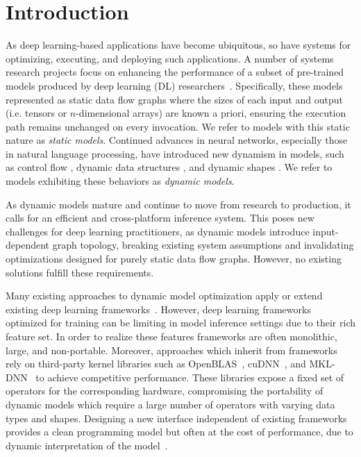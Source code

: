 \section{Introduction}
\label{sec:Relay-intro}

As deep learning-based applications have become ubiquitous, so have systems for optimizing, executing, and deploying such applications. A number of systems research projects focus on enhancing the performance of a subset of pre-trained models produced by deep learning (DL) researchers~\citep{Dahl2011taslp, yu2011improved, han2016isca, NIPS2016johnson}.
Specifically, these models represented as static data flow graphs where the sizes of each input and output (i.e. tensors or $n$-dimensional arrays) are known a priori, ensuring the execution path remains unchanged on every invocation.
We refer to models with this static nature as \emph{static models}.
Continued advances in neural networks, especially those in natural language processing, have introduced new dynamism in models, such as control flow \citep{lstm, language_model}, dynamic data structures \citep{tree_lstm, graph_lstm}, and dynamic shapes \citep{devlin2018bert}. We refer to models exhibiting these behaviors as {\em dynamic models}.

As dynamic models mature and continue to move from research to production, it calls for an efficient and cross-platform inference system.
This poses new challenges for deep learning practitioners, as dynamic models introduce input-dependent graph topology, breaking existing system assumptions and invalidating optimizations designed for purely static data flow graphs.
However, no existing solutions fulfill these requirements.

Many existing approaches to dynamic model optimization apply or extend existing deep learning frameworks~\citep{xu2018cavs, gao2018low, yu2018dynamic, jeong2018improving, jeong2019janus, dynet, tf_fold}.
However, deep learning frameworks optimized for training can be limiting in model inference settings due to their rich feature set. In order to realize these features frameworks are often monolithic, large, and non-portable.
Moreover, approaches which inherit from frameworks rely on third-party kernel libraries such as OpenBLAS~\citep{xianyi2014openblas}, cuDNN~\citep{cudnn}, and MKL-DNN~\citep{mkldnn} to achieve competitive performance. These libraries expose a fixed set of operators for the corresponding hardware, compromising the portability of dynamic models which require a large number of operators with varying data types and shapes. Designing a new interface independent of existing frameworks provides a clean programming model but often at the cost of performance, due to dynamic interpretation of the model~\citep{dynet}.

